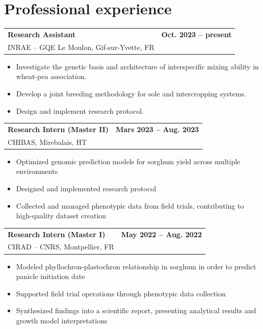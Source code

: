 \documentclass[10pt,a4paper]{article}
\makeatletter
\newcommand{\sizeTitre}{\fontsize{11}{13.2}\selectfont}  %
\newcommand{\sizeDate} {\fontsize{10}{13.2}\selectfont}  %
\newcommand{\sizeOrg}  {\fontsize{10}{12}\selectfont}    %
\newcommand{\sizeLieu} {\fontsize{10}{12}\selectfont}    %
\newcommand{\cventry}[5][2pt]{%
  \par\noindent\begin{tabularx}{\textwidth}{@{}Xr@{}}
    {\sizeTitre\textbf{#2}} & {\sizeDate\textbf{#5}}\\
    {\sizeOrg #3}   & {\sizeLieu #4}\\
  \end{tabularx}\par\vspace{#1}}
\makeatother
\begin{document}
\section{Professional experience}
\cventry[-2pt]{Research Assistant}{INRAE -- GQE Le Moulon, Gif-sur-Yvette, FR}{}{Oct. 2023 -- present}
\begin{itemize}[label=\textbullet]
  \item Investigate the genetic basis and architecture of interspecific mixing ability in wheat-pea association.
  \item Develop a joint breeding methodology for sole and intercropping systems.
  \item Design and implement research protocol.
\end{itemize}
\bigskip
\cventry[-2pt]{Research Intern (Master II)}{CHIBAS, Mirebalais, HT}{}{Mars 2023 -- Aug. 2023}
\begin{itemize}[label=\textbullet]
  \item Optimized genomic prediction models for sorghum yield across multiple environments
	\item Designed and implemented research protocol
	\item Collected and managed phenotypic data from field trials, contributing to high-quality dataset creation
\end{itemize}
\bigskip
\cventry[-2pt]{Research Intern (Master I)}{CIRAD -- CNRS, Montpellier, FR}{}{May 2022 -- Aug. 2022}
\begin{itemize}[label=\textbullet]
  \item Modeled phyllochron-plastochron relationship in sorghum in order to predict panicle initiation date
  \item Supported field trial operations through phenotypic data collection
\item Synthesized findings into a scientific report, presenting analytical results and growth model interpretations
\end{itemize}

\end{document}
